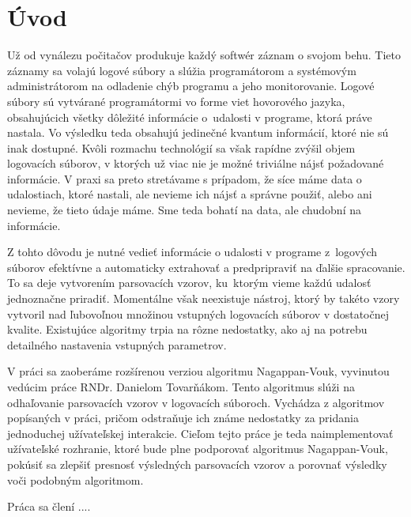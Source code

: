 \chapter{Úvod}

Už od vynálezu počitačov produkuje každý softwér záznam o svojom behu. Tieto záznamy sa volajú logové súbory a slúžia programátorom a systémovým administrátorom na odladenie chýb programu a jeho monitorovanie. Logové súbory sú vytvárané programátormi vo forme viet hovorového jazyka, obsahujúcich všetky dôležité informácie o~udalosti v programe, ktorá práve nastala. Vo výsledku teda obsahujú jedinečné kvantum informácií, ktoré nie sú inak dostupné. Kvôli rozmachu technológií sa však rapídne zvýšil objem logovacích súborov, v ktorých už viac nie je možné triviálne nájsť požadované informácie. V praxi sa preto stretávame s prípadom, že síce máme data o udalostiach, ktoré nastali, ale nevieme ich nájsť a správne použiť, alebo ani nevieme, že tieto údaje máme. Sme teda bohatí na data, ale chudobní na informácie.
\par Z tohto dôvodu je nutné vedieť informácie o udalosti v programe z~logových súborov efektívne a automaticky extrahovať a predpripraviť na ďalšie spracovanie. To sa deje vytvorením parsovacích vzorov, ku~ktorým vieme každú udalosť jednoznačne priradiť. Momentálne však neexistuje nástroj, ktorý by takéto vzory vytvoril nad ľubovoľnou množinou vstupných logovacích súborov v dostatočnej kvalite. Existujúce algoritmy trpia na rôzne nedostatky, ako aj na potrebu detailného nastavenia vstupných parametrov.
\par V práci sa zaoberáme rozšírenou verziou algoritmu Nagappan-Vouk, vyvinutou vedúcim práce RNDr. Danielom Tovarňákom. Tento algoritmus slúži na odhaľovanie parsovacích vzorov v logovacích súboroch. Vychádza z algoritmov popísaných v práci, pričom odstra\-ňu\-je ich známe nedostatky za pridania jednoduchej užívateľskej interakcie. Cieľom tejto práce je teda naimplementovať užívateľské rozhranie, ktoré bude plne podporovať algoritmus Nagappan-Vouk, pokúsiť sa zlepšiť presnosť výsledných parsovacích vzorov a porovnať výsledky voči podobným algoritmom.
 \par Práca sa člení ....